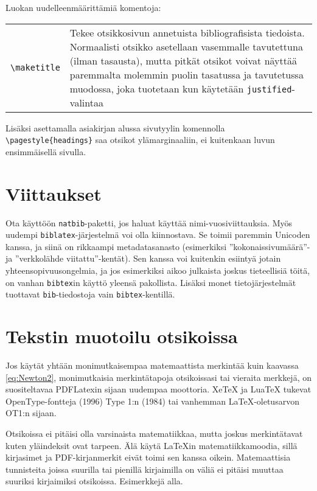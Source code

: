 \documentclass[globalnumbering,centeredcaptions,draftfooter]{tutthesis/tutthesis} %
\begin{document}
Luokan uudelleenmäärittämiä komentoja:

\begin{tabular}[h]{@{} p{} p{} @{}}
  \verb|\maketitle| & Tekee otsikkosivun annetuista bibliografisista tiedoista. Normaalisti otsikko asetellaan vasemmalle tavutettuna (ilman tasausta), mutta pitkät otsikot voivat näyttää paremmalta molemmin puolin tasatussa ja tavutetussa muodossa, joka tuotetaan kun käytetään \texttt{justified}-valintaa
\end{tabular}

Lisäksi asettamalla asiakirjan alussa sivutyylin komennolla \verb|\pagestyle{headings}| saa otsikot ylämarginaaliin, ei kuitenkaan luvun ensimmäisellä sivulla.

\section{Viittaukset}
Ota käyttöön \texttt{natbib}-paketti, jos haluat käyttää nimi-vuosiviittauksia.
Myös uudempi \texttt{biblatex}-järjestelmä voi olla kiinnostava.
Se toimii paremmin Unicoden kanssa, ja siinä on rikkaampi metadatasanasto (esimerkiksi ''kokonaissivumäärä''- ja ''verkkolähde viitattu''-kentät).
Sen kanssa voi kuitenkin esiintyä jotain yhteensopivuusongelmia, ja jos esimerkiksi aikoo julkaista joskus tieteellisiä töitä, on vanhan \texttt{bibtex}in käyttö yleensä pakollista.
Lisäksi monet tietojärjestelmät tuottavat \texttt{bib}-tiedostoja vain \texttt{bibtex}-kentillä.


\section{Tekstin muotoilu otsikoissa}

Jos käytät yhtään monimutkaisempaa matemaattista merkintää kuin kaavassa \eqref{eq:Newton2}, monimutkaisia merkintätapoja otsikoissasi tai vieraita merkkejä, on suositeltavaa PDFLatexin sijaan uudempaa moottoria.
XeTeX ja LuaTeX tukevat OpenType-fontteja (1996) Type 1:n (1984) tai vanhemman LaTeX-oletusarvon OT1:n sijaan.

Otsikoissa ei pitäisi olla varsinaista matematiikkaa, mutta joskus merkintätavat kuten yläindeksit ovat tarpeen.
Älä käytä LaTeXin matematiikkamoodia, sillä kirjasimet ja PDF-kirjanmerkit eivät toimi sen kanssa oikein.
Matemaattisia tunnisteita joissa suurilla tai pienillä kirjaimilla on väliä ei pitäisi muuttaa suuriksi kirjaimiksi otsikoissa.
Esimerkkejä alla.
\end{document}
